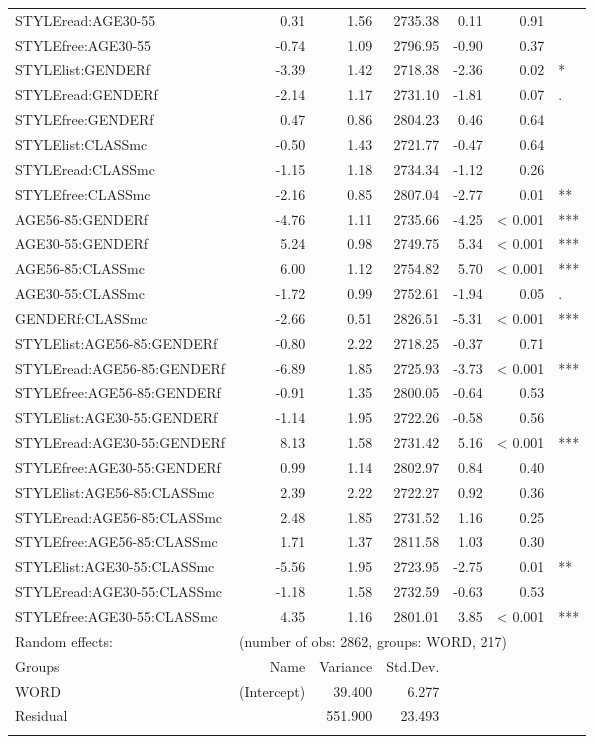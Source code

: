 {\begin{longtable}[c]{p{}rrrrrl}
		STYLEread:AGE30-55 & 0.31 & 1.56 & 2735.38 & 0.11 & 0.91 & \\ 
		STYLEfree:AGE30-55 & -0.74 & 1.09 & 2796.95 & -0.90 & 0.37 & \\ 
		STYLElist:GENDERf & -3.39 & 1.42 & 2718.38 & -2.36 & 0.02 & * \\ 
		STYLEread:GENDERf & -2.14 & 1.17 & 2731.10 & -1.81 & 0.07 & . \\ 
		STYLEfree:GENDERf & 0.47 & 0.86 & 2804.23 & 0.46 & 0.64 & \\ 
		STYLElist:CLASSmc & -0.50 & 1.43 & 2721.77 & -0.47 & 0.64 & \\ 
		STYLEread:CLASSmc & -1.15 & 1.18 & 2734.34 & -1.12 & 0.26 & \\ 
		STYLEfree:CLASSmc & -2.16 & 0.85 & 2807.04 & -2.77 & 0.01 & ** \\ 
		AGE56-85:GENDERf & -4.76 & 1.11 & 2735.66 & -4.25 & < 0.001 & *** \\ 
		AGE30-55:GENDERf & 5.24 & 0.98 & 2749.75 & 5.34 & < 0.001 & *** \\ 
		AGE56-85:CLASSmc & 6.00 & 1.12 & 2754.82 & 5.70 & < 0.001 & *** \\ 
		AGE30-55:CLASSmc & -1.72 & 0.99 & 2752.61 & -1.94 & 0.05 & . \\ 
		GENDERf:CLASSmc & -2.66 & 0.51 & 2826.51 & -5.31 & < 0.001 & *** \\ 
		STYLElist:AGE56-85:GENDERf & -0.80 & 2.22 & 2718.25 & -0.37 & 0.71 & \\ 
		STYLEread:AGE56-85:GENDERf & -6.89 & 1.85 & 2725.93 & -3.73 & < 0.001 & *** \\ 
		STYLEfree:AGE56-85:GENDERf & -0.91 & 1.35 & 2800.05 & -0.64 & 0.53 & \\ 
		STYLElist:AGE30-55:GENDERf & -1.14 & 1.95 & 2722.26 & -0.58 & 0.56 & \\ 
		STYLEread:AGE30-55:GENDERf & 8.13 & 1.58 & 2731.42 & 5.16 & < 0.001 & *** \\ 
		STYLEfree:AGE30-55:GENDERf & 0.99 & 1.14 & 2802.97 & 0.84 & 0.40 & \\ 
		STYLElist:AGE56-85:CLASSmc & 2.39 & 2.22 & 2722.27 & 0.92 & 0.36 & \\ 
		STYLEread:AGE56-85:CLASSmc & 2.48 & 1.85 & 2731.52 & 1.16 & 0.25 & \\ 
		STYLEfree:AGE56-85:CLASSmc & 1.71 & 1.37 & 2811.58 & 1.03 & 0.30 & \\ 
		STYLElist:AGE30-55:CLASSmc & -5.56 & 1.95 & 2723.95 & -2.75 & 0.01 & ** \\ 
		STYLEread:AGE30-55:CLASSmc & -1.18 & 1.58 & 2732.59 & -0.63 & 0.53 & \\ 
		STYLEfree:AGE30-55:CLASSmc & 4.35 & 1.16 & 2801.01 & 3.85 & < 0.001 & *** \\
		\midrule
		Random effects: & \multicolumn{6}{l}{(number of obs: 2862, groups: WORD, 217)} \\
		Groups &         Name & Variance &      Std.Dev. & & & \\
		WORD &  (Intercept) & 39.400 & 6.277 & & & \\
		Residual  &         & 551.900 & 23.493 & & & \\
		\lspbottomrule
	\end{longtable}
}

